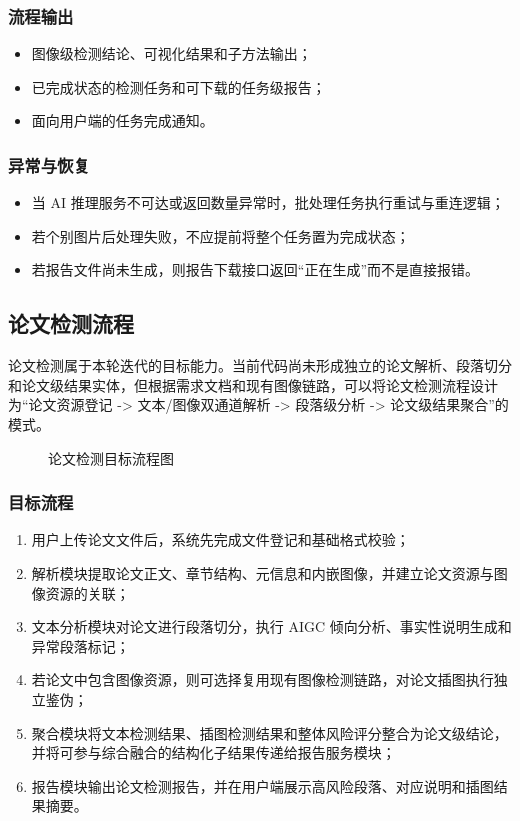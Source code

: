 \subsubsection{流程输出}
\begin{itemize}[leftmargin=2em]
    \item 图像级检测结论、可视化结果和子方法输出；
    \item 已完成状态的检测任务和可下载的任务级报告；
    \item 面向用户端的任务完成通知。
\end{itemize}

\subsubsection{异常与恢复}
\begin{itemize}[leftmargin=2em]
    \item 当 AI 推理服务不可达或返回数量异常时，批处理任务执行重试与重连逻辑；
    \item 若个别图片后处理失败，不应提前将整个任务置为完成状态；
    \item 若报告文件尚未生成，则报告下载接口返回“正在生成”而不是直接报错。
\end{itemize}

\subsection{论文检测流程}
论文检测属于本轮迭代的目标能力。当前代码尚未形成独立的论文解析、段落切分和论文级结果实体，但根据需求文档和现有图像链路，可以将论文检测流程设计为“论文资源登记 -> 文本/图像双通道解析 -> 段落级分析 -> 论文级结果聚合”的模式。

\begin{figure}[H]
    \centering
    \resizebox{0.98\textwidth}{!}{}
    \caption{论文检测目标流程图}
\end{figure}

\subsubsection{目标流程}
\begin{enumerate}[leftmargin=2em]
    \item 用户上传论文文件后，系统先完成文件登记和基础格式校验；
    \item 解析模块提取论文正文、章节结构、元信息和内嵌图像，并建立论文资源与图像资源的关联；
    \item 文本分析模块对论文进行段落切分，执行 AIGC 倾向分析、事实性说明生成和异常段落标记；
    \item 若论文中包含图像资源，则可选择复用现有图像检测链路，对论文插图执行独立鉴伪；
    \item 聚合模块将文本检测结果、插图检测结果和整体风险评分整合为论文级结论，并将可参与综合融合的结构化子结果传递给报告服务模块；
    \item 报告模块输出论文检测报告，并在用户端展示高风险段落、对应说明和插图结果摘要。
\end{enumerate}

